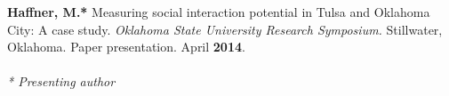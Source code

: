 \begin{cventries}
   \cventry
      {}
      {}
      {}
      {}
      {
        \begin{cvitems}
          \vspace{-2mm}
        \item {\textbf{Haffner, M.*} Measuring social interaction potential in
            Tulsa and Oklahoma City: A case study. \textit{Oklahoma State
              University Research Symposium.} Stillwater,
            Oklahoma. Paper presentation. April \textbf{2014}.} \\\\
          \textit{* Presenting author}
              \end{cvitems}
            }

\end{cventries}